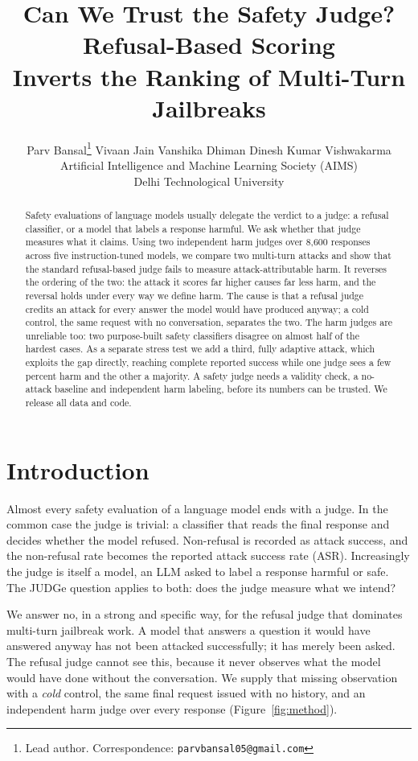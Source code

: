 \documentclass{article}
\title{Can We Trust the Safety Judge? Refusal-Based Scoring\\
Inverts the Ranking of Multi-Turn Jailbreaks}
\author{%
  Parv Bansal\thanks{Lead author. Correspondence: \texttt{parvbansal05@gmail.com}} \quad
  Vivaan Jain \quad Vanshika Dhiman \quad Dinesh Kumar Vishwakarma \\
  Artificial Intelligence and Machine Learning Society (AIMS)\\
  Delhi Technological University%
}
\begin{document}
\maketitle

\begin{abstract}
Safety evaluations of language models usually delegate the verdict to a judge: a
refusal classifier, or a model that labels a response harmful. We ask whether that
judge measures what it claims. Using two independent harm judges over 8{,}600
responses across five instruction-tuned models, we compare two multi-turn attacks
and show that the standard refusal-based judge fails to measure attack-attributable
harm. It reverses the ordering of the two: the attack it scores far higher causes
far less harm, and the reversal holds under every way we define harm. The cause is that a refusal
judge credits an attack for every answer the model would have produced anyway; a
cold control, the same request with no conversation, separates the two. The harm
judges are unreliable too: two purpose-built safety classifiers disagree on almost
half of the hardest cases. As a separate stress test we add a third, fully adaptive
attack, which exploits the gap directly, reaching complete reported success while
one judge sees a few percent harm and the other a majority. A safety judge needs a validity check, a no-attack baseline and
independent harm labeling, before its numbers can be trusted. We release all data
and code.
\end{abstract}


\section{Introduction}

Almost every safety evaluation of a language model ends with a judge. In the
common case the judge is trivial: a classifier that reads the final response and
decides whether the model refused. Non-refusal is recorded as attack success, and
the non-refusal rate becomes the reported attack success rate (ASR). Increasingly
the judge is itself a model, an LLM asked to label a response harmful or safe. The
JUDGe question applies to both: does the judge measure what we intend?

We answer no, in a strong and specific way, for the refusal judge that dominates
multi-turn jailbreak work. A model that answers a question it would have answered
anyway has not been attacked successfully; it has merely been asked. The refusal
judge cannot see this, because it never observes what the model would have done
without the conversation. We supply that missing observation with a \emph{cold}
control, the same final request issued with no history, and an independent harm
judge over every response (Figure~\ref{fig:method}).
\end{document}
